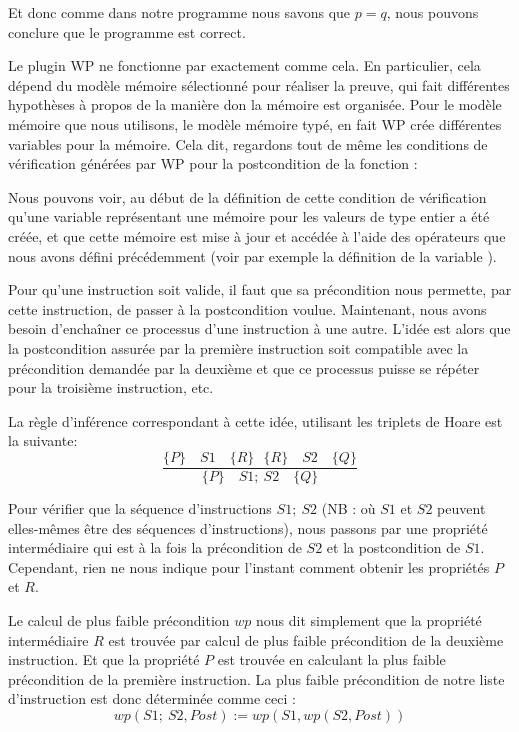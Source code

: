 Et donc comme dans notre programme nous savons que $p = q$, nous pouvons conclure que
le programme est correct.


Le plugin WP ne fonctionne par exactement comme cela. En particulier, cela dépend du
modèle mémoire sélectionné pour réaliser la preuve, qui fait différentes hypothèses à
propos de la manière don la mémoire est organisée. Pour le modèle mémoire que nous 
utilisons, le modèle mémoire typé, en fait WP crée différentes variables pour la mémoire.
Cela dit, regardons tout de même les conditions de vérification générées par WP pour la
postcondition de la fonction  :



Nous pouvons voir, au début de la définition de cette condition de vérification qu'une
variable  représentant une mémoire pour les valeurs de type entier
a été créée, et que cette mémoire est mise à jour et accédée à l'aide des opérateurs que
nous avons défini précédemment (voir par exemple la définition de la variable
).




Pour qu'une instruction soit valide, il faut que sa précondition nous 
permette, par cette instruction, de passer à la postcondition voulue. 
Maintenant, nous avons besoin d'enchaîner ce processus d'une 
instruction à une autre. L'idée est alors que la postcondition assurée par la
première instruction soit compatible avec la précondition demandée par la 
deuxième et que ce processus puisse se répéter pour la troisième instruction, 
etc.



La règle d'inférence correspondant à cette idée, utilisant les triplets de 
Hoare est la suivante:
$$\dfrac{\{P\}\quad S1 \quad \{R\} \ \ \ \{R\}\quad S2 \quad \{Q\}}{\{P\}\quad S1 ;\ S2 \quad \{Q\}}$$



Pour vérifier que la séquence d'instructions $S1;\ S2$ (NB : où $S1$ et $S2$ 
peuvent elles-mêmes être des séquences d'instructions), nous passons par une 
propriété intermédiaire qui est à la fois la précondition de $S2$ et la 
postcondition de $S1$. Cependant, rien ne nous indique pour l'instant 
comment obtenir les propriétés $P$ et $R$.



Le calcul de plus faible précondition $wp$ nous dit simplement que la 
propriété intermédiaire $R$ est trouvée par calcul de plus faible précondition
de la deuxième instruction. Et que la propriété $P$ est trouvée en calculant la
plus faible précondition de la première instruction. La plus faible précondition
de notre liste d'instruction est donc déterminée comme ceci :
$$wp(S1;\ S2 , Post) := wp(S1, wp(S2, Post) )$$




